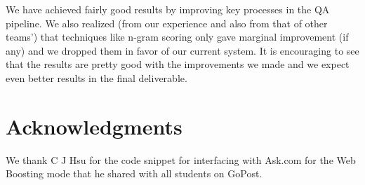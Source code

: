 \documentclass[11pt]{article}
\begin{document}
We have achieved fairly good results by improving key processes in the QA pipeline. We also realized (from our experience and also from that of other teams') that techniques like n-gram scoring only gave marginal improvement (if any) and we dropped them in favor of our current system. It is encouraging to see that the results are pretty good with the improvements we made and we expect even better results in the final deliverable.
\section*{Acknowledgments}
We thank C J Hsu for the code snippet for interfacing with Ask.com for the Web Boosting mode that he shared with all students on GoPost.

\printbibliography
\end{document}
